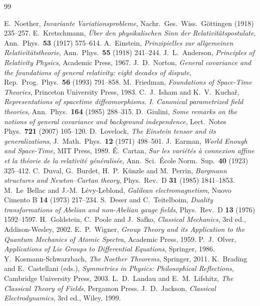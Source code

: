 \documentclass[11pt,a4paper,openany]{book}
\theoremstyle{definition}
\theoremstyle{plain}
\theoremstyle{remark}
\begin{document}
\begin{thebibliography}{99}
 E.~Noether, \emph{Invariante Variationsprobleme},
  Nachr.\ Ges.\ Wiss.\ G\"ottingen (1918) 235--257.
 E.~Kretschmann, \emph{\"Uber den physikalischen Sinn der
  Relativit\"atspostulate}, Ann.\ Phys.\ \textbf{53} (1917) 575--614.
 A.~Einstein, \emph{Prinzipielles zur allgemeinen
  Relativit\"atstheorie}, Ann.\ Phys.\ \textbf{55} (1918) 241--244.
 J.~L.~Anderson, \emph{Principles of Relativity Physics},
  Academic Press, 1967.
 J.~D.~Norton, \emph{General covariance and the foundations of
  general relativity: eight decades of dispute}, Rep.\ Prog.\ Phys.\
  \textbf{56} (1993) 791--858.
 M.~Friedman, \emph{Foundations of Space-Time Theories},
  Princeton University Press, 1983.
 C.~J.~Isham and K.~V.~Kucha\v{r}, \emph{Representations of
  spacetime diffeomorphisms. I. Canonical parametrized field theories},
  Ann.\ Phys.\ \textbf{164} (1985) 288--315.
 D.~Giulini, \emph{Some remarks on the notions of general
  covariance and background independence}, Lect.\ Notes Phys.\ \textbf{721}
  (2007) 105--120.
 D.~Lovelock, \emph{The Einstein tensor and its
  generalizations}, J.\ Math.\ Phys.\ \textbf{12} (1971) 498--501.
\bibitem{earman} J.~Earman, \emph{World Enough and Space-Time}, MIT Press, 1989.
\bibitem{cartan} \'E.~Cartan, \emph{Sur les vari\'et\'es \`a connexion affine
  et la th\'eorie de la relativit\'e g\'en\'eralis\'ee}, Ann.\ Sci.\ \'Ecole
  Norm.\ Sup.\ \textbf{40} (1923) 325--412.
 C.~Duval, G.~Burdet, H.~P.~K\"unzle and M.~Perrin,
  \emph{Bargmann structures and Newton--Cartan theory}, Phys.\ Rev.\ D
  \textbf{31} (1985) 1841--1853.
 M.~Le~Bellac and J.-M.~L\'evy-Leblond, \emph{Galilean
  electromagnetism}, Nuovo Cimento B \textbf{14} (1973) 217--234.
\bibitem{deser} S.~Deser and C.~Teitelboim, \emph{Duality transformations of
  Abelian and non-Abelian gauge fields}, Phys.\ Rev.\ D \textbf{13} (1976)
  1592--1597.
 H.~Goldstein, C.~Poole and J.~Safko, \emph{Classical
  Mechanics}, 3rd ed., Addison-Wesley, 2002.
 E.~P.~Wigner, \emph{Group Theory and its Application to the
  Quantum Mechanics of Atomic Spectra}, Academic Press, 1959.
 P.~J.~Olver, \emph{Applications of Lie Groups to Differential
  Equations}, Springer, 1986.
 Y.~Kosmann-Schwarzbach, \emph{The Noether Theorems}, Springer, 2011.
\bibitem{bc} K.~Brading and E.~Castellani (eds.), \emph{Symmetries in Physics:
  Philosophical Reflections}, Cambridge University Press, 2003.
 L.~D.~Landau and E.~M.~Lifshitz, \emph{The Classical Theory of
  Fields}, Pergamon Press.
 J.~D.~Jackson, \emph{Classical Electrodynamics}, 3rd ed.,
  Wiley, 1999.
\end{thebibliography}
\end{document}
